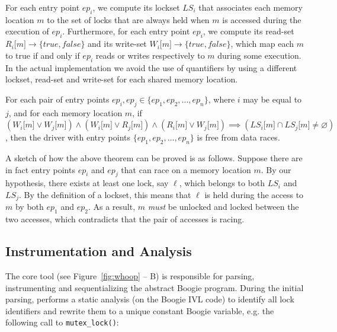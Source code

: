{For each entry point $\mathit{ep}_{i}$, we compute its lockset $\mathit{LS}_{i}$ that associates each memory location $m$ to the set of locks that are always held when $m$ is accessed during the execution of $\mathit{ep}_{i}$. Furthermore, for each entry point $\mathit{ep}_{i}$, we compute its read-set $R_{i}\lbrack m\rbrack \rightarrow \{true, false\}$ and its write-set $W_{i}\lbrack m\rbrack \rightarrow \{true, false\}$, which map each $m$ to true if and only if $\mathit{ep}_{i}$ reads or writes respectively to $m$ during some execution. In the actual implementation we avoid the use of quantifiers by using a different lockset, read-set and write-set for each shared memory location.

\begin{theorem}
\label{theorem:locksets}
For each pair of entry points $\mathit{ep}_{i}, \mathit{ep}_{j}\in \{\mathit{ep}_{1}, \mathit{ep}_{2}, ..., \mathit{ep}_{n}\}$, where $i$ may be equal to $j$, and for each memory location $m$, if $(W_{i}\lbrack m\rbrack \vee W_{j}\lbrack m\rbrack) \wedge (W_{i}\lbrack m\rbrack \vee R_{j}\lbrack m\rbrack) \wedge (R_{i}\lbrack m\rbrack \vee W_{j}\lbrack m\rbrack) \implies (\mathit{LS}_{i}\lbrack m\rbrack \cap \mathit{LS}_{j}\lbrack m\rbrack \not= \varnothing)$, then the driver with entry points $\{\mathit{ep}_{1}, \mathit{ep}_{2}, \dotsc, \mathit{ep}_{n}\}$ is free from data races.
\end{theorem}

A sketch of how the above theorem can be proved is as follows. Suppose there are in fact entry points $\mathit{ep}_{i}$ and $\mathit{ep}_{j}$ that can race on a memory location $m$. By our hypothesis, there exists at least one lock, say $\ell$, which belongs to both $\mathit{LS}_{i}$ and $\mathit{LS}_{j}$. By the definition of a lockset, this means that $\ell$ is held during the access to $m$ by both $ep_1$ and $ep_2$. As a result, $m$ \emph{must} be unlocked and locked between the two accesses, which contradicts that the pair of accesses is racing.

\subsection{Instrumentation and Analysis}
\label{whoop:method}

The core \whoop tool (see Figure~\ref{fig:whoop} -- B) is responsible for parsing, instrumenting and sequentializing the abstract Boogie program. During the initial parsing, \whoop performs a static analysis (on the Boogie IVL code) to identify all lock identifiers and rewrite them to a unique constant Boogie variable, e.g. the following call to \texttt{mutex\_lock()}:

}
